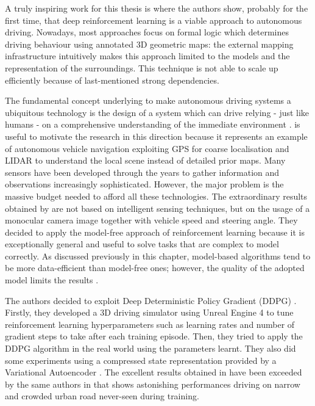 A truly inspiring work for this thesis is \cite{kendall2019learning} where the authors show, probably for the first time, that deep reinforcement learning is a viable approach to autonomous driving.
Nowadays,  most approaches focus on formal logic which determines driving behaviour using annotated 3D geometric maps: the external mapping infrastructure intuitively makes this approach limited to the models and the representation of the surroundings.
This technique is not able to scale up efficiently because of last-mentioned strong dependencies.

The fundamental concept underlying \cite{kendall2019learning} to make autonomous driving systems a ubiquitous technology is the design of a system which can drive relying - just like humans - on a comprehensive understanding of the immediate environment \cite{badrinarayanan2017segnet}.
\cite{ort2018autonomous} is useful to motivate the research in this direction because it represents an example of autonomous vehicle navigation exploiting GPS for coarse localisation and LIDAR to understand the local scene instead of detailed prior maps.
Many sensors have been developed through the years to gather information and observations increasingly sophisticated. However, the major problem is the massive budget needed to afford all these technologies.
The extraordinary results obtained by \cite{kendall2019learning} are not based on intelligent sensing techniques, but on the usage of a monocular camera image together with vehicle speed and steering angle.
They decided to apply the model-free approach of reinforcement learning because it is exceptionally general and useful to solve tasks that are complex to model correctly. As discussed previously in this chapter, model-based algorithms tend to be more data-efficient than model-free ones; however, the quality of the adopted model limits the results \cite{deisenroth2011pilco}.

The authors decided to exploit Deep Deterministic Policy Gradient (DDPG) \cite{lillicrap2015continuous}.
Firstly, they developed a 3D driving simulator using Unreal Engine 4 to tune reinforcement learning hyperparameters such as learning rates and number of gradient steps to take after each training episode. Then, they tried to apply the DDPG algorithm in the real world using the parameters learnt. They also did some experiments using a compressed state representation provided by a Variational Autoencoder \cite{kingma2013auto,rezende2014stochastic}.
The excellent results obtained in \cite{kendall2019learning} have been exceeded by the same authors in \cite{wayve2019human} that shows astonishing performances driving on narrow and crowded urban road never-seen during training.

